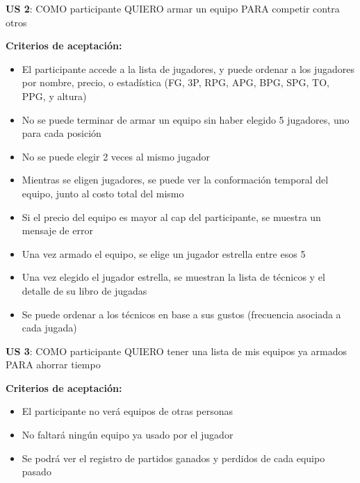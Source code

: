 \begin{tcolorbox}
\textbf{US 2}: COMO participante QUIERO armar un equipo PARA competir contra otros

\vline

\textbf{Criterios de aceptación:}
\begin{itemize}
\item El participante accede a la lista de jugadores, y puede ordenar a los jugadores por nombre, precio, o estadística (FG, 3P, RPG, APG, BPG, SPG, TO, PPG, y altura)
\item No se puede terminar de armar un equipo sin haber elegido 5 jugadores, uno para cada posición 
\item No se puede elegir 2 veces al mismo jugador
\item Mientras se eligen jugadores, se puede ver la conformación temporal del equipo, junto al costo total del mismo
\item Si el precio del equipo es mayor al cap del participante, se muestra un mensaje de error
\item Una vez armado el equipo, se elige un jugador estrella entre esos 5
\item Una vez elegido el jugador estrella, se muestran la lista de técnicos y el detalle de su libro de jugadas
\item Se puede ordenar a los técnicos en base a sus gustos (frecuencia asociada a cada jugada)
\end{itemize}
\end{tcolorbox}
\vspace{10pt}

\begin{tcolorbox}
\textbf{US 3}: COMO participante QUIERO tener una lista de mis equipos ya armados PARA ahorrar tiempo

\vline

\textbf{Criterios de aceptación:}
\begin{itemize}
\item El participante no verá equipos de otras personas
\item No faltará ningún equipo ya usado por el jugador
\item Se podrá ver el registro de partidos ganados y perdidos de cada equipo pasado
\end{itemize}
\end{tcolorbox}
\vspace{10pt}


